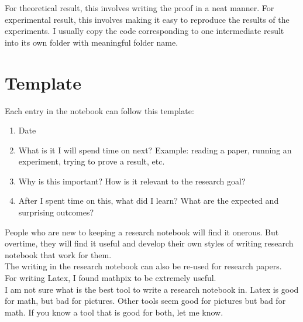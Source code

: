 \documentclass[11pt]{article}
\begin{document}
For theoretical result, this involves writing the proof in a neat manner. For experimental result, this involves making it easy to reproduce the results of the experiments. I usually copy the code corresponding to one intermediate result into its own folder with meaningful folder name. 

\section{Template}

Each entry in the notebook can follow this template:

\begin{enumerate}
	\item Date
	\item What is it I will spend time on next? Example: reading a paper, running an experiment, trying to prove a result, etc.
	\item Why is this important? How is it relevant to the research goal?
	\item After I spent time on this, what did I learn? What are the expected and surprising outcomes?
\end{enumerate}

People who are new to keeping a research notebook will find it onerous. But overtime, they will find it useful and develop their own styles of writing research notebook that work for them.
\\

The writing in the research notebook can also be re-used for research papers.
\\

For writing Latex, I found mathpix to be extremely useful. 
\\

I am not sure what is the best tool to write a research notebook in. Latex is good for math, but bad for pictures. Other tools seem good for pictures but bad for math. If you know a tool that is good for both, let me know.
\end{document}

